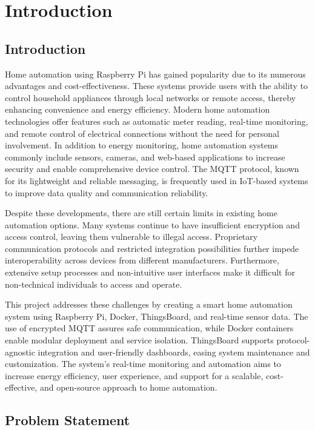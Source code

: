 \documentclass[a4paper,12pt]{report}
\begin{document}
\tableofcontents
\listoffigures
\newpage
\chapter{Introduction}
\section{Introduction}
Home automation using Raspberry Pi has gained popularity due to its numerous advantages and cost-effectiveness. These systems provide users with the ability to control household appliances through local networks or remote access, thereby enhancing convenience and energy efficiency\cite{jain2014raspberry}. Modern home automation technologies offer features such as automatic meter reading, real-time monitoring, and remote control of electrical connections without the need for personal involvement\cite{chaudhari2017smart}. In addition to energy monitoring, home automation systems commonly include sensors, cameras, and web-based applications to increase security and enable comprehensive device control\cite{patchava2015smart}. The MQTT protocol, known for its lightweight and reliable messaging, is frequently used in IoT-based systems to improve data quality and communication reliability.

Despite these developments, there are still certain limits in existing home automation options. Many systems continue to have insufficient encryption and access control, leaving them vulnerable to illegal access. Proprietary communication protocols and restricted integration possibilities further impede interoperability across devices from different manufacturers. Furthermore, extensive setup processes and non-intuitive user interfaces make it difficult for non-technical individuals to access and operate.

This project addresses these challenges by creating a smart home automation system using Raspberry Pi, Docker, ThingsBoard, and real-time sensor data. The use of encrypted MQTT assures safe communication, while Docker containers enable modular deployment and service isolation. ThingsBoard supports protocol-agnostic integration and user-friendly dashboards, easing system maintenance and customization. The system's real-time monitoring and automation aims to increase energy efficiency, user experience, and support for a scalable, cost-effective, and open-source approach to home automation.

\section{Problem Statement}
\end{document}
